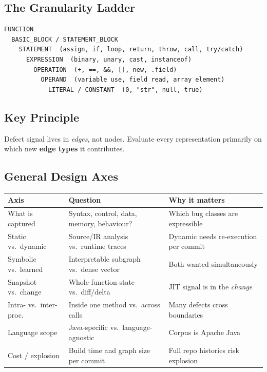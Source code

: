 \documentclass[12pt,a4paper]{article}
\begin{document}
\subsection{The Granularity Ladder}

\begin{lstlisting}
FUNCTION
  BASIC_BLOCK / STATEMENT_BLOCK
    STATEMENT  (assign, if, loop, return, throw, call, try/catch)
      EXPRESSION  (binary, unary, cast, instanceof)
        OPERATION  (+, ==, &&, [], new, .field)
          OPERAND  (variable use, field read, array element)
            LITERAL / CONSTANT  (0, "str", null, true)
\end{lstlisting}

\subsection{Key Principle}

Defect signal lives in \emph{edges}, not nodes. Evaluate every representation
primarily on which new \textbf{edge types} it contributes.

\subsection{General Design Axes}

\begin{longtable}{p{3.2cm}p{5cm}p{4.5cm}}
\toprule
\textbf{Axis} & \textbf{Question} & \textbf{Why it matters} \\
\midrule
\endhead
What is captured & Syntax, control, data, memory, behaviour? & Which bug classes are expressible \\
Static vs.\ dynamic & Source/IR analysis vs.\ runtime traces & Dynamic needs re-execution per commit \\
Symbolic vs.\ learned & Interpretable subgraph vs.\ dense vector & Both wanted simultaneously \\
Snapshot vs.\ change & Whole-function state vs.\ diff/delta & JIT signal is in the \emph{change} \\
Intra- vs.\ inter-proc. & Inside one method vs.\ across calls & Many defects cross boundaries \\
Language scope & Java-specific vs.\ language-agnostic & Corpus is Apache Java \\
Cost / explosion & Build time and graph size per commit & Full repo histories risk explosion \\
\bottomrule
\end{longtable}
\end{document}
